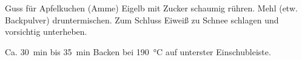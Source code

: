 \begin{MyRecipe}{Guss für Apfelkuchen (Amme)}{}{}
	Eigelb mit Zucker schaumig rühren. Mehl (etw. Backpulver) druntermischen. Zum Schluss Eiweiß zu Schnee schlagen und vorsichtig unterheben.\par\bigskip
	
	Ca. \SI{30}{\minute} bis \SI{35}{\minute} Backen bei \SI{190}{\degreeCelsius} auf unterster Einschubleiste.
	
\end{MyRecipe}